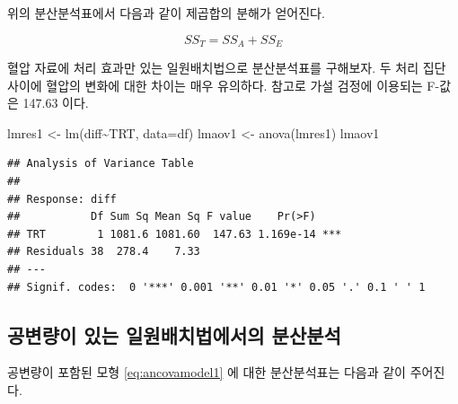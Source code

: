 \documentclass[
]{book}
\newenvironment{Shaded}{\begin{snugshade}}{\end{snugshade}}
\newcommand{\AttributeTok}[1]{\textcolor[rgb]{0.77,0.63,0.00}{#1}}
\newcommand{\FunctionTok}[1]{\textcolor[rgb]{0.00,0.00,0.00}{#1}}
\newcommand{\NormalTok}[1]{#1}
\newcommand{\OtherTok}[1]{\textcolor[rgb]{0.56,0.35,0.01}{#1}}
\newcommand{\SpecialCharTok}[1]{\textcolor[rgb]{0.00,0.00,0.00}{#1}}
\begin{document}
위의 분산분석표에서 다음과 같이 제곱합의 분해가 얻어진다.

\begin{equation}
SS_T = SS_A + SS_E
\label{eq:ssdecomp1}
\end{equation}

혈압 자료에 처리 효과만 있는 일원배치법으로 분산분석표를 구해보자. 두 처리 집단 사이에 혈압의 변화에 대한 차이는 매우 유의하다. 참고로 가설 검정에 이용되는 F-값은 147.63 이다.

\begin{Shaded}
\begin{Highlighting}[]
\NormalTok{lmres1 }\OtherTok{\textless{}{-}} \FunctionTok{lm}\NormalTok{(diff}\SpecialCharTok{\textasciitilde{}}\NormalTok{TRT, }\AttributeTok{data=}\NormalTok{df)}
\NormalTok{lmaov1 }\OtherTok{\textless{}{-}} \FunctionTok{anova}\NormalTok{(lmres1)}
\NormalTok{lmaov1}
\end{Highlighting}
\end{Shaded}

\begin{verbatim}
## Analysis of Variance Table
## 
## Response: diff
##           Df Sum Sq Mean Sq F value    Pr(>F)    
## TRT        1 1081.6 1081.60  147.63 1.169e-14 ***
## Residuals 38  278.4    7.33                      
## ---
## Signif. codes:  0 '***' 0.001 '**' 0.01 '*' 0.05 '.' 0.1 ' ' 1
\end{verbatim}

\hypertarget{uxacf5uxbcc0uxb7c9uxc774-uxc788uxb294-uxc77cuxc6d0uxbc30uxce58uxbc95uxc5d0uxc11cuxc758-uxbd84uxc0b0uxbd84uxc11d}{%
\subsection{공변량이 있는 일원배치법에서의 분산분석}\label{uxacf5uxbcc0uxb7c9uxc774-uxc788uxb294-uxc77cuxc6d0uxbc30uxce58uxbc95uxc5d0uxc11cuxc758-uxbd84uxc0b0uxbd84uxc11d}}

공변량이 포함된 모형 \eqref{eq:ancovamodel1} 에 대한 분산분석표는 다음과 같이 주어진다.
\end{document}

